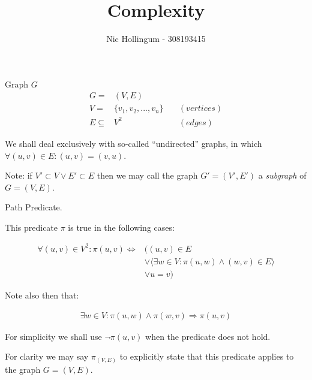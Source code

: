 \documentclass{article}
\author{Nic Hollingum - 308193415}
\title{Complexity}
\begin{document}
\begin{definition}
Graph $G$
\begin{align}
	\nonumber G = & (V,E) \\
	\nonumber V = & \{v_1, v_2, ..., v_n\} \quad & (vertices)\\
	\nonumber E \subseteq & V^2 & (edges)
\end{align}

We shall deal exclusively with so-called ``undirected'' graphs, in which $\forall (u,v) \in E : (u,v) = (v,u)$.

Note: if $V' \subset V \vee E' \subset E$ then we may call the graph $G'=(V',E')$ a \emph{subgraph} of $G=(V,E)$.
\end{definition}

\begin{definition}
Path Predicate.

This predicate $\pi$ is true in the following cases:

\begin{align}
	\nonumber \forall (u,v) \in V^2 : \pi(u, v) \Leftrightarrow & ( (u, v) \in E \\
	\nonumber & \vee \langle \exists w \in V : \pi(u, w) \wedge (w, v) \in E \rangle \\
	\nonumber & \vee u = v )
\end{align}

Note also then that:

\begin{align}
	\nonumber \exists w \in V : \pi(u, w) \wedge \pi(w, v) \Rightarrow \pi(u, v)
\end{align}

For simplicity we shall use $\neg\pi(u, v)$ when the predicate does not hold.

For clarity we may say $\pi_{(V,E)}$ to explicitly state that this predicate applies to the graph $G=(V,E)$.

\end{definition}
\end{document}
